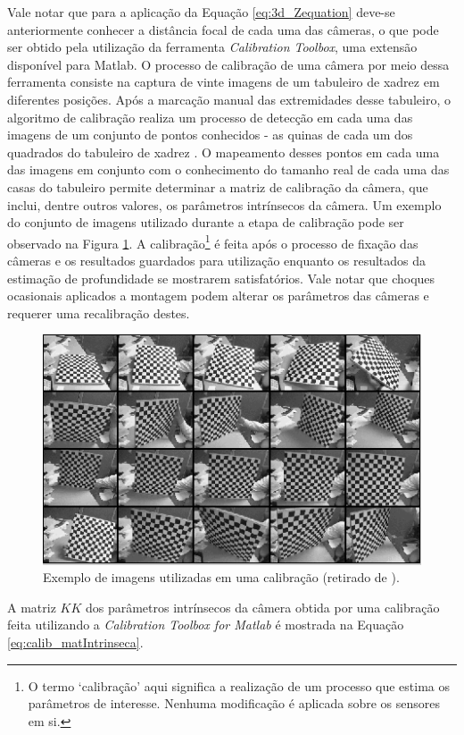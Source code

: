 Vale notar que para a aplicação da Equação \ref{eq:3d_Zequation} deve-se
anteriormente conhecer a distância focal de cada uma das câmeras, o que pode ser
obtido pela utilização da ferramenta \textit{Calibration Toolbox}, uma extensão
disponível para Matlab. O processo de calibração de uma câmera por meio dessa
ferramenta consiste na captura de vinte imagens de um tabuleiro de xadrez em
diferentes posições. Após a marcação manual das extremidades desse tabuleiro, o
algoritmo de calibração realiza um processo de detecção em cada uma das imagens
de um conjunto de pontos conhecidos - as quinas de cada um dos quadrados do
tabuleiro de xadrez . O mapeamento desses pontos em cada uma das imagens em
conjunto com o conhecimento do tamanho real de cada uma das casas do tabuleiro
permite determinar a matriz de calibração da câmera, que inclui, dentre outros
valores, os parâmetros intrínsecos da câmera. Um exemplo do conjunto de imagens
utilizado durante a etapa de calibração pode ser observado na Figura
\ref{fig:calib_imagens}.  A calibração\footnote{O termo `calibração' aqui
significa a realização de um processo que estima os parâmetros de interesse.
Nenhuma modificação é aplicada sobre os sensores em si.} é feita após o processo
de fixação das câmeras e os resultados guardados para utilização enquanto os
resultados da estimação de profundidade se mostrarem satisfatórios. Vale notar
que choques ocasionais aplicados a montagem podem alterar os parâmetros das
câmeras e requerer uma recalibração destes. 

\begin{figure}[h!]
\centering
\includegraphics[width=.6\linewidth]{figs/TG_calib_images.png}
\caption{Exemplo de imagens utilizadas em uma calibração (retirado de \cite{bouguetML}).}
\label{fig:calib_imagens}
\end{figure}

A matriz $KK$ dos parâmetros intrínsecos da câmera obtida por uma calibração
feita utilizando a \textit{Calibration Toolbox for Matlab} é mostrada na Equação
\ref{eq:calib_matIntrinseca}.

